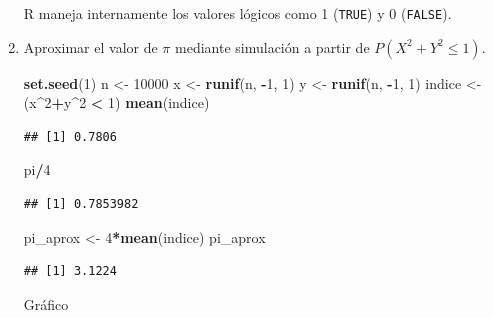\documentclass[]{book}
\newenvironment{Shaded}{\begin{snugshade}}{\end{snugshade}}
\newcommand{\KeywordTok}[1]{\textcolor[rgb]{0.13,0.29,0.53}{\textbf{#1}}}
\newcommand{\DecValTok}[1]{\textcolor[rgb]{0.00,0.00,0.81}{#1}}
\newcommand{\StringTok}[1]{\textcolor[rgb]{0.31,0.60,0.02}{#1}}
\newcommand{\OperatorTok}[1]{\textcolor[rgb]{0.81,0.36,0.00}{\textbf{#1}}}
\newcommand{\NormalTok}[1]{#1}
\theoremstyle{definition}
\theoremstyle{definition}
\theoremstyle{definition}
\theoremstyle{remark}
\begin{document}
\begin{enumerate}
  {}R maneja internamente los valores lógicos
  como 1 (\texttt{TRUE}) y 0 (\texttt{FALSE}).

\item
  Aproximar el valor de \(\pi\) mediante simulación a partir de
  \(P\left( X^2 +Y^2 \leq 1 \right)\).

\begin{Shaded}
\begin{Highlighting}[]
\KeywordTok{set.seed}\NormalTok{(}\DecValTok{1}\NormalTok{)}
\NormalTok{n <-}\StringTok{ }\DecValTok{10000}
\NormalTok{x <-}\StringTok{ }\KeywordTok{runif}\NormalTok{(n, }\OperatorTok{-}\DecValTok{1}\NormalTok{, }\DecValTok{1}\NormalTok{)}
\NormalTok{y <-}\StringTok{ }\KeywordTok{runif}\NormalTok{(n, }\OperatorTok{-}\DecValTok{1}\NormalTok{, }\DecValTok{1}\NormalTok{)}
\NormalTok{indice <-}\StringTok{ }\NormalTok{(x}\OperatorTok{^}\DecValTok{2}\OperatorTok{+}\NormalTok{y}\OperatorTok{^}\DecValTok{2} \OperatorTok{<}\StringTok{ }\DecValTok{1}\NormalTok{)}
\KeywordTok{mean}\NormalTok{(indice)}
\end{Highlighting}
\end{Shaded}

\begin{verbatim}
## [1] 0.7806
\end{verbatim}

\begin{Shaded}
\begin{Highlighting}[]
\NormalTok{pi}\OperatorTok{/}\DecValTok{4}
\end{Highlighting}
\end{Shaded}

\begin{verbatim}
## [1] 0.7853982
\end{verbatim}

\begin{Shaded}
\begin{Highlighting}[]
\NormalTok{pi_aprox <-}\StringTok{ }\DecValTok{4}\OperatorTok{*}\KeywordTok{mean}\NormalTok{(indice)}
\NormalTok{pi_aprox}
\end{Highlighting}
\end{Shaded}

\begin{verbatim}
## [1] 3.1224
\end{verbatim}

  Gráfico


\end{enumerate}
\end{document}
